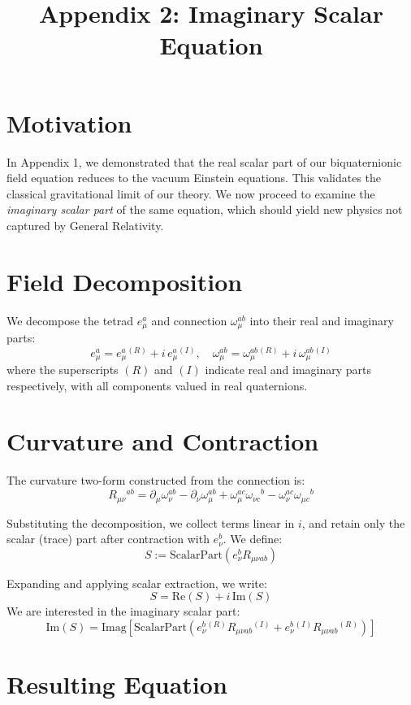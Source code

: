 \documentclass[12pt]{article}
\title{Appendix 2: Imaginary Scalar Equation}
\author{}
\date{}
\begin{document}
\maketitle

\section*{Motivation}

In Appendix 1, we demonstrated that the real scalar part of our biquaternionic field equation reduces to the vacuum Einstein equations. This validates the classical gravitational limit of our theory. We now proceed to examine the \emph{imaginary scalar part} of the same equation, which should yield new physics not captured by General Relativity.

\section*{Field Decomposition}

We decompose the tetrad $e^a_\mu$ and connection $\omega_\mu^{ab}$ into their real and imaginary parts:
\[
e^a_\mu = e^a_\mu{}^{(R)} + i\,e^a_\mu{}^{(I)}, \quad
\omega_\mu^{ab} = \omega_\mu^{ab}{}^{(R)} + i\,\omega_\mu^{ab}{}^{(I)}
\]
where the superscripts $(R)$ and $(I)$ indicate real and imaginary parts respectively, with all components valued in real quaternions.

\section*{Curvature and Contraction}

The curvature two-form constructed from the connection is:
\[
R_{\mu\nu}{}^{ab} = \partial_\mu \omega_\nu^{ab} - \partial_\nu \omega_\mu^{ab} + \omega_\mu^{ac} \omega_{\nu c}{}^b - \omega_\nu^{ac} \omega_{\mu c}{}^b
\]

Substituting the decomposition, we collect terms linear in $i$, and retain only the scalar (trace) part after contraction with $e^b_\nu$. We define:
\[
S := \text{ScalarPart} \left( e^b_\nu R_{\mu\nu ab} \right)
\]

Expanding and applying scalar extraction, we write:
\[
S = \text{Re}(S) + i\,\text{Im}(S)
\]
We are interested in the imaginary scalar part:
\[
\text{Im}(S) = \text{Imag} \left[ \text{ScalarPart} \left( e^b_\nu{}^{(R)} R_{\mu\nu ab}{}^{(I)} + e^b_\nu{}^{(I)} R_{\mu\nu ab}{}^{(R)} \right) \right]
\]

\section*{Resulting Equation}
\end{document}
